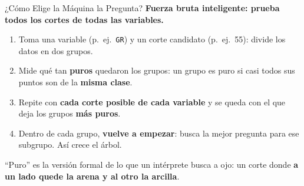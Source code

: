 \documentclass[aspectratio=169, 11pt]{beamer}
\begin{document}
\begin{frame}[shrink=8]{¿Cómo Elige la Máquina la Pregunta?}
  \vspace{-4pt}
  {\small\color{arcaDark}\bfseries
    Fuerza bruta inteligente: prueba \textbf{todos} los cortes de \textbf{todas} las variables.}

  \vspace{8pt}
  {\footnotesize\color{textMuted}
  \begin{enumerate}\setlength{\itemsep}{8pt}
    \item[{\color{arcaRed}\bfseries 1.}]
      Toma una variable (p.\ ej.\ \texttt{GR}) y un corte candidato (p.\ ej.\ 55):
      divide los datos en dos grupos.
    \item[{\color{arcaRed}\bfseries 2.}]
      Mide qué tan \textbf{puros} quedaron los grupos: un grupo es puro si
      casi todos sus puntos son de la \textbf{misma clase}.
    \item[{\color{arcaRed}\bfseries 3.}]
      Repite con \textbf{cada corte posible de cada variable} y se queda con
      el que deja los grupos \textbf{más puros}.
    \item[{\color{arcaRed}\bfseries 4.}]
      Dentro de cada grupo, \textbf{vuelve a empezar}: busca la mejor pregunta
      para ese subgrupo. Así crece el árbol.
  \end{enumerate}
  }

  \vspace{8pt}
  {\footnotesize\color{textMuted}
    \faLightbulb[regular]\hspace{4pt}%
    ``Puro'' es la versión formal de lo que un intérprete busca a ojo:
    un corte donde \textbf{a un lado quede la arena y al otro la arcilla}.}
\end{frame}
\end{document}
